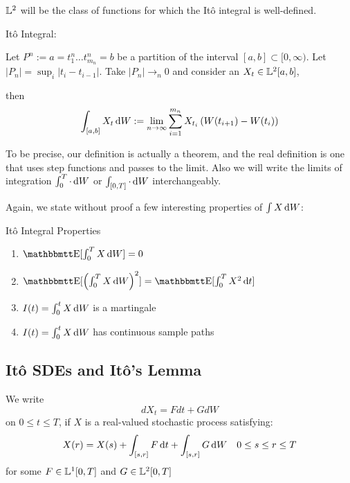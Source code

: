 ${\mathbb{L}^2}$ will be the class of functions for which the It\^o integral is
well-defined. 
\begin{defn} It\^o Integral:
\label{defn:ito_integral}

Let $P^n := {a = t^n_1 \ldots t^n_{m_n} = b}$ be a partition of the interval
$[a,b] \subset [0, \infty)$. Let $|P_n| = \sup_i|t_i - t_{i-1}|$. 
Take $|P_n| \rightarrow_n 0 $ and consider an $ X_t \in {\mathbb{L}^2}[a,b]$,

then
\begin{equation}
\int_{[a,b]} X_t \, \mathrm{d} W := \lim_{n \rightarrow \infty}  
\sum_{i=1}^{m_n} X_{t_i}\left( W(t_{i+1}) - W(t_{i})\right)
\end{equation}

\end{defn}

To be precise, our definition is actually a theorem, and the real
definition is one that uses step functions and passes to the limit.  Also we
will write the limits of integration $\int_0^T \cdot  \, \mathrm{d} W$ or $\int_{[0,T]}
\cdot  \, \mathrm{d} W$ interchangeably. 

Again, we state without proof a few interesting properties of $\int X \, \mathrm{d} W$:
\begin{thm} It\^o Integral Properties

\begin{enumerate}
  \item $\Exp[\int_0^T X \intd{W} ] = 0$ 
  \item $\Exp[\left(\int_0^T X \intd{W}\right)^2 ] = \Exp[\int_0^T X^2
  \intd{t}]$
  \item $I(t) = \int_0^t X \, \mathrm{d} W $ is a martingale 
  \item $I(t) = \int_0^t X \, \mathrm{d} W $ has continuous sample paths
\end{enumerate}
\end{thm}

\subsection{It\^o SDEs and It\^o's Lemma}
\begin{defn}[It\^o SDE]

We write
\begin{equation}
dX_t = F dt + G dW
\end{equation}
on $0 \leq t \leq T$, if $X$ is a real-valued stochastic process satisfying:
\begin{equation*}
X(r) = X(s) + \int_{[s,r]} F \, \mathrm{d} t + \int_{[s,r]} G \, \mathrm{d} W
\quad 0\leq s \leq r \leq T
\end{equation*}
for some $F \in {\mathbb{L}^1}[0,T]$ and $G \in {\mathbb{L}^2}[0,T]$
\end{defn}

